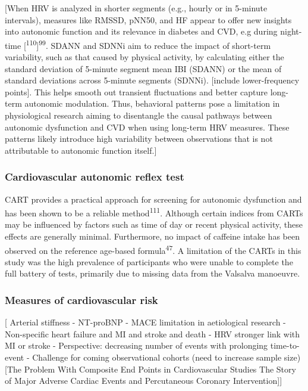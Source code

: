 \documentclass[
  a4paper,
  headsepline=true,
  open=any]{scrbook}
\begin{document}
{[}When HRV is analyzed in shorter segments (e.g., hourly or in 5-minute
intervals), measures like RMSSD, pNN50, and HF appear to offer new
insights into autonomic function and its relevance in diabetes and CVD,
e.g during night-time {[}\textsuperscript{110}{]}\textsuperscript{99}.
SDANN and SDNNi aim to reduce the impact of short-term variability, such
as that caused by physical activity, by calculating either the standard
deviation of 5-minute segment mean IBI (SDANN) or the mean of standard
deviations across 5-minute segments (SDNNi). {[}include lower-frequency
points{]}. This helps smooth out transient fluctuations and better
capture long-term autonomic modulation. Thus, behavioral patterns pose a
limitation in physiological research aiming to disentangle the causal
pathways between autonomic dysfunction and CVD when using long-term HRV
measures. These patterns likely introduce high variability between
observations that is not attributable to autonomic function itself.{]}

\hypertarget{cardiovascular-autonomic-reflex-test}{%
\subsubsection{Cardiovascular autonomic reflex
test}\label{cardiovascular-autonomic-reflex-test}}

CART provides a practical approach for screening for autonomic
dysfunction and has been shown to be a reliable
method\textsuperscript{111}. Although certain indices from CARTs may be
influenced by factors such as time of day or recent physical activity,
these effects are generally minimal. Furthermore, no impact of caffeine
intake has been observed on the reference age-based
formula\textsuperscript{47}. A limitation of the CARTs in this study was
the high prevalence of participants who were unable to complete the full
battery of tests, primarily due to missing data from the Valsalva
manoeuvre.

\hypertarget{measures-of-cardiovascular-risk}{%
\subsubsection{Measures of cardiovascular
risk}\label{measures-of-cardiovascular-risk}}

{[} Arterial stiffness - NT-proBNP - MACE limitation in aetiological
research - Non-specific heart failure and MI and stroke and death - HRV
stronger link with MI or stroke - Perspective: decreasing number of
events with prolonging time-to-event - Challenge for coming
observational cohorts (need to increase sample size) {[}The Problem With
Composite End Points in Cardiovascular Studies The Story of Major
Adverse Cardiac Events and Percutaneous Coronary Intervention{]}{]}
\end{document}
